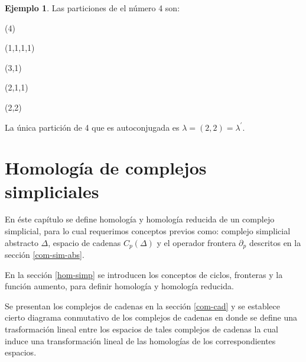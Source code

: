 \documentclass[12pt]{book}
\theoremstyle{definition}
\newtheorem{example}[theorem]{Ejemplo}
\newcounter{in}
\newcounter{ini}
\begin{document}
\begin{example}Las particiones de el número 4 son:
  \begin{center}
    \begin{minipage}[h]{0.2\linewidth}
      \centering {}

      (4)
    \end{minipage}
    \begin{minipage}[h]{0.15\linewidth}
      \centering {}

      (1,1,1,1)
    \end{minipage}
    \begin{minipage}[h]{0.2\linewidth}
      \centering {}
      
      (3,1)
    \end{minipage}
    \begin{minipage}[h]{0.2\linewidth}
      \centering {}
      
      (2,1,1)
    \end{minipage}
    \begin{minipage}[h]{0.2\linewidth}
      \centering {}
      
      (2,2)
    \end{minipage}
  \end{center}
 La única partición de 4 que es autoconjugada es $\lambda=(2,2)=\lambda^{'}$.
\end{example}

\chapter{Homología de complejos simpliciales}
\label{cha:hom-com-sim}

En éste capítulo se define homología  y homología reducida de un
complejo simplicial, para lo cual requerimos conceptos previos como:
complejo simplicial abstracto $\Delta$, espacio de cadenas $C_{p}(\Delta)$ y el
operador frontera $\partial_{p}$ descritos en la sección
\ref{com-sim-abs}. 

En la sección \ref{hom-simp} se introducen los conceptos de ciclos, fronteras y la
función aumento, para definir homología y homología reducida.

Se presentan los complejos de cadenas en la sección \ref{com-cad} y se
establece cierto diagrama conmutativo de los complejos de cadenas en donde
se define una trasformación lineal entre los espacios de tales
complejos de cadenas la cual induce una transformación lineal de las homologías
de los correspondientes espacios.
\end{document}
